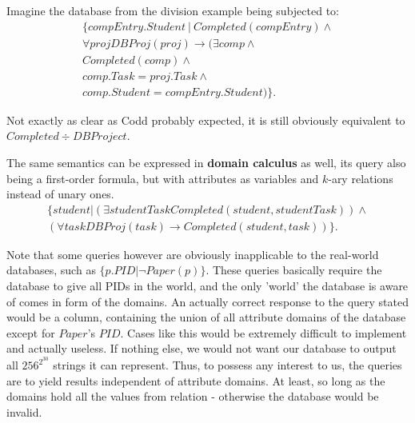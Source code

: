 \documentclass[12pt]{article}
\begin{document}
Imagine the database from the division example being subjected to:
\[
\begin{aligned}
\{ compEntry.Student\ |\ Completed(compEntry) \wedge \\
	\forall proj DBProj(proj)  \rightarrow ( \exists comp \wedge \\ Completed(comp) \wedge \\
	comp.Task = proj.Task \wedge \\ comp.Student = compEntry.Student ) \}.
\end{aligned}
\]

Not exactly as clear as Codd probably expected, it is still obviously
equivalent to $Completed \div DBProject$.

The same semantics can be expressed in \textbf{domain calculus} as well, its query also being
a first-order formula, but with attributes as variables and $k$-ary relations instead of
unary ones.
\[
\begin{aligned}
\{ student | (\exists studentTask Completed(student, studentTask)) \wedge \\
	(\forall task DBProj(task)  \rightarrow  Completed(student, task)) \}.
\end{aligned}
\]

Note that some queries however are obviously inapplicable to the real-world databases, such as
$\{ p.PID | \neg Paper(p) \}$. These queries basically require the database to give all PIDs
in the world, and the only 'world' the database is aware of comes in form of the domains. An actually
correct response to the query stated would be a column, containing the union of all attribute domains of the
database except for $Paper$'s $PID$. Cases like this would be extremely difficult to implement and actually useless.
If nothing else, we would not want our database to output all $256^{2^{30}}$ strings it can represent. Thus,
to possess any interest to us, the queries are to yield results independent of attribute domains. At least,
so long as the domains hold all the values from relation - otherwise the database would be invalid.
\end{document}
